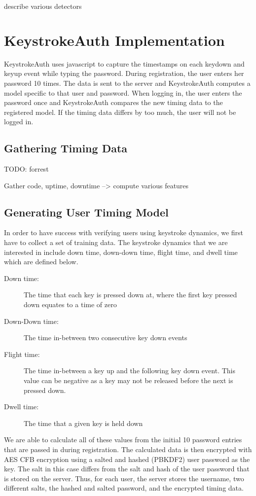 \documentclass{article}
\begin{document}
describe various detectors

\section{KeystrokeAuth Implementation}
KeystrokeAuth uses javascript to capture the timestamps on each keydown and keyup event while typing the password.
During registration, the user enters her password 10 times.
The data is sent to the server and KeystrokeAuth computes a model specific to that user and password.
When logging in, the user enters the password once and KeystrokeAuth compares the new timing data to the registered model.
If the timing data differs by too much, the user will not be logged in.

\subsection{Gathering Timing Data}
TODO: forrest

Gather code, uptime, downtime --> compute various features

\subsection{Generating User Timing Model}
In order to have success with verifying users using keystroke dynamics, we first have to collect a set of training data. The keystroke dynamics that we are interested in include down time, down-down time, flight time, and dwell time which are defined below. 
\begin{description}
	\item[Down time:] The time that each key is pressed down at, where the first key pressed down equates to a time of zero
	\item[Down-Down time:] The time in-between two consecutive key down events
	\item[Flight time:] The time in-between a key up and the following key down event. This value can be negative as a key may not be released before the next is pressed down. 
	\item[Dwell time:] The time that a given key is held down
\end{description}
We are able to calculate all of these values from the initial 10 password entries that are passed in during registration. The calculated data is then encrypted with AES CFB encryption using a salted and hashed (PBKDF2) user password as the key. The salt in this case differs from the salt and hash of the user password that is stored on the server. Thus, for each user, the server stores the username, two different salts, the hashed and salted password, and the encrypted timing data.
\end{document}
